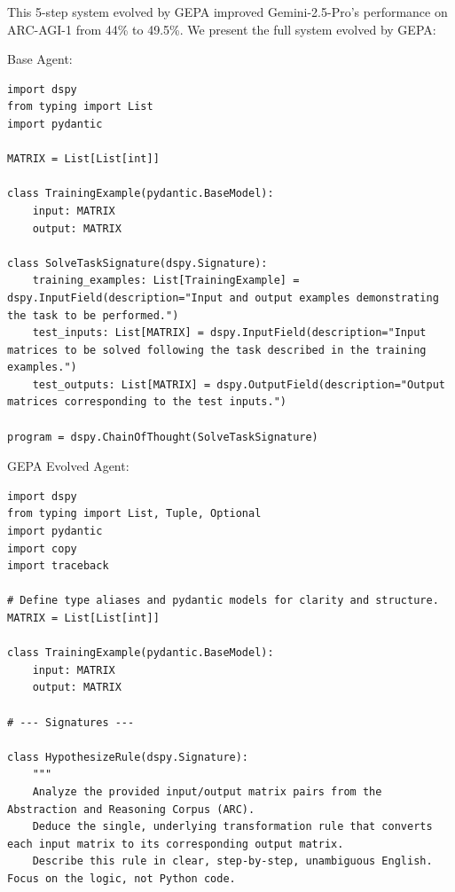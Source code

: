 This 5-step system evolved by GEPA improved Gemini-2.5-Pro's performance on ARC-AGI-1 from 44\% to 49.5\%. We present the full system evolved by GEPA:
\begin{instructbox}
Base Agent:
\begin{lstlisting}[breakindent=0pt, breaklines=true, breakatwhitespace=true, frame=single, backgroundcolor=\color{gray!10}]
import dspy
from typing import List
import pydantic

MATRIX = List[List[int]]

class TrainingExample(pydantic.BaseModel):
    input: MATRIX
    output: MATRIX

class SolveTaskSignature(dspy.Signature):
    training_examples: List[TrainingExample] = dspy.InputField(description="Input and output examples demonstrating the task to be performed.")
    test_inputs: List[MATRIX] = dspy.InputField(description="Input matrices to be solved following the task described in the training examples.")
    test_outputs: List[MATRIX] = dspy.OutputField(description="Output matrices corresponding to the test inputs.")

program = dspy.ChainOfThought(SolveTaskSignature)
\end{lstlisting}

GEPA Evolved Agent:
\begin{lstlisting}[breakindent=0pt, breaklines=true, breakatwhitespace=true, frame=single, backgroundcolor=\color{blue!10}]
import dspy
from typing import List, Tuple, Optional
import pydantic
import copy
import traceback

# Define type aliases and pydantic models for clarity and structure.
MATRIX = List[List[int]]

class TrainingExample(pydantic.BaseModel):
    input: MATRIX
    output: MATRIX

# --- Signatures ---

class HypothesizeRule(dspy.Signature):
    """
    Analyze the provided input/output matrix pairs from the Abstraction and Reasoning Corpus (ARC).
    Deduce the single, underlying transformation rule that converts each input matrix to its corresponding output matrix.
    Describe this rule in clear, step-by-step, unambiguous English. Focus on the logic, not Python code.


\end{lstlisting}
\end{instructbox}
